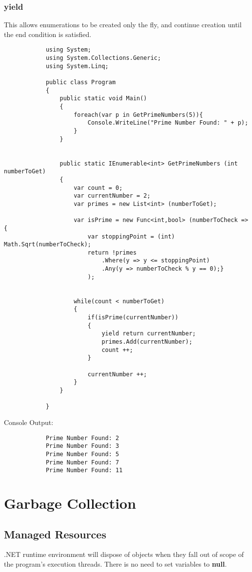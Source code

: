 \documentclass {amsart}
\begin{document}
		\subsubsection {yield}  This allows enumerations to be created only the fly, and continue creation until the end condition is satisfied.

		\begin{lstlisting}
			using System;
			using System.Collections.Generic;
			using System.Linq;

			public class Program
			{
				public static void Main()
				{
					foreach(var p in GetPrimeNumbers(5)){
						Console.WriteLine("Prime Number Found: " + p);	
					}
				}
				
				
				public static IEnumerable<int> GetPrimeNumbers (int numberToGet)
				{
					var count = 0;
					var currentNumber = 2;
					var primes = new List<int> (numberToGet); 

					var isPrime = new Func<int,bool> (numberToCheck => {
						var stoppingPoint = (int) Math.Sqrt(numberToCheck);
						return !primes
							.Where(y => y <= stoppingPoint)
							.Any(y => numberToCheck % y == 0);}
						); 		
					
					
					while(count < numberToGet)
					{
						if(isPrime(currentNumber))
						{
							yield return currentNumber;
							primes.Add(currentNumber);
							count ++;		   
						}
						
						currentNumber ++;
					}
				}
				
			}

		\end{lstlisting}
	Console Output: 
		\begin{verbatim}
			Prime Number Found: 2
			Prime Number Found: 3
			Prime Number Found: 5
			Prime Number Found: 7
			Prime Number Found: 11
		\end{verbatim}

\section{Garbage Collection}
	\subsection{Managed Resources} .NET runtime environment will dispose of objects when they fall out of scope of the program's execution threads.  There is no need to set variables to {\bf null}.
\end{document}
